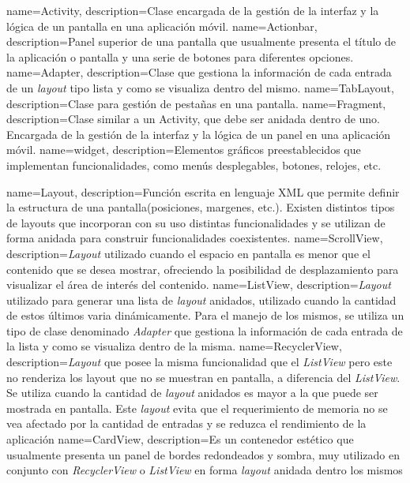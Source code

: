 {
    name=Activity,
    description={Clase encargada de la gestión de la interfaz y la lógica de un pantalla en una aplicación móvil.}
}
{
    name=Actionbar,
    description={Panel superior de una pantalla que usualmente presenta el título de la aplicación o pantalla y una serie de botones para diferentes opciones.}
}
{
    name=Adapter,
    description={Clase que gestiona la información de cada entrada de un \textit{layout} tipo lista y como se visualiza dentro del mismo.}
}
{
    name=TabLayout,
    description={Clase para gestión de pestañas en una pantalla.}
}
{
    name=Fragment,
    description={Clase similar a un Activity, que debe ser anidada dentro de uno. Encargada de la gestión de la interfaz y la lógica de un panel en una aplicación móvil.}
}
{
    name=widget,
    description={Elementos gráficos preestablecidos que implementan funcionalidades, como menús desplegables, botones, relojes, etc.}
}


{
    name=Layout,
    description={Función escrita en lenguaje XML que permite definir la estructura de una pantalla(posiciones, margenes, etc.). Existen distintos tipos de layouts que incorporan con su uso distintas funcionalidades y se utilizan de forma anidada para construir funcionalidades coexistentes.}
}
{
    name=ScrollView,
    description={\textit{Layout} utilizado cuando el espacio en pantalla es menor que el contenido que se desea mostrar, ofreciendo la posibilidad de desplazamiento para visualizar el área de interés del contenido.}
}
{
    name=ListView,
    description={\textit{Layout} utilizado para generar una lista de \textit{layout} anidados, utilizado cuando la cantidad de estos últimos varia dinámicamente. Para el manejo de los mismos, se utiliza un tipo de clase denominado \textit{Adapter} que gestiona la información de cada entrada de la lista y como se visualiza dentro de la misma.}
}
{
    name=RecyclerView,
    description={\textit{Layout} que posee la misma funcionalidad que el \textit{ListView} pero este no renderiza los layout que no se muestran en pantalla, a diferencia del \textit{ListView}. Se utiliza cuando la cantidad de \textit{layout} anidados es mayor a la que puede ser mostrada en pantalla. Este \textit{layout} evita que el requerimiento de memoria no se vea afectado por la cantidad de entradas y se reduzca el rendimiento de la aplicación}
}
{
    name=CardView,
    description={Es un contenedor estético que usualmente presenta un panel de bordes redondeados y sombra, muy utilizado en conjunto con \textit{RecyclerView} o \textit{ListView} en forma \textit{layout} anidada dentro los mismos}
}

